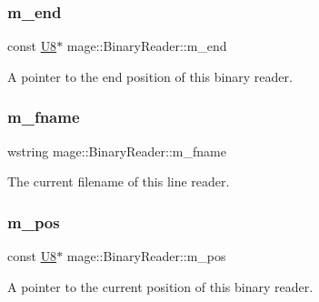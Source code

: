 \subsubsection{\texorpdfstring{m\+\_\+end}{m\_end}}
{\footnotesize\ttfamily const \hyperlink{namespacemage_afc638980bc6154f15af5e2d93a0e0ea9}{U8}$\ast$ mage\+::\+Binary\+Reader\+::m\+\_\+end\hspace{0.3cm}{\ttfamily [private]}}

A pointer to the end position of this binary reader. \hypertarget{classmage_1_1_binary_reader_a9c97c02d53ce60a9952751ad4f55414f}{}\label{classmage_1_1_binary_reader_a9c97c02d53ce60a9952751ad4f55414f} 
\subsubsection{\texorpdfstring{m\+\_\+fname}{m\_fname}}
{\footnotesize\ttfamily wstring mage\+::\+Binary\+Reader\+::m\+\_\+fname\hspace{0.3cm}{\ttfamily [private]}}

The current filename of this line reader. \hypertarget{classmage_1_1_binary_reader_aedb9632de1cf95d5af49499217744ed5}{}\label{classmage_1_1_binary_reader_aedb9632de1cf95d5af49499217744ed5} 
\subsubsection{\texorpdfstring{m\+\_\+pos}{m\_pos}}
{\footnotesize\ttfamily const \hyperlink{namespacemage_afc638980bc6154f15af5e2d93a0e0ea9}{U8}$\ast$ mage\+::\+Binary\+Reader\+::m\+\_\+pos\hspace{0.3cm}{\ttfamily [private]}}

A pointer to the current position of this binary reader. 